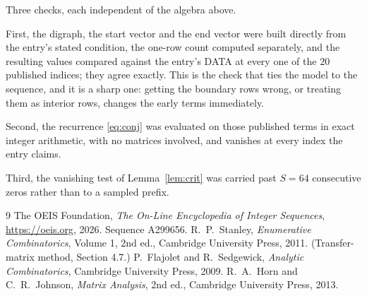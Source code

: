\documentclass[11pt,a4paper]{article}
\theoremstyle{plain}
\theoremstyle{definition}
\begin{document}
Three checks, each independent of the algebra above.

First, the digraph, the start vector and the end vector were built directly from the
entry's stated condition, the one-row count computed separately, and the resulting values
compared against the entry's DATA at every one of the $20$ published indices; they
agree exactly. This is the check that ties the model to the sequence, and it is a sharp one:
getting the boundary rows wrong, or treating them as interior rows, changes the early terms
immediately.

Second, the recurrence \eqref{eq:conj} was evaluated on those published terms in exact
integer arithmetic, with no matrices involved, and vanishes at every index the entry claims.

Third, the vanishing test of Lemma~\ref{lem:crit} was carried past $S=64$ consecutive
zeros rather than to a sampled prefix.

\begin{thebibliography}{9}
 The OEIS Foundation, \emph{The On-Line Encyclopedia of Integer
Sequences}, \url{https://oeis.org}, 2026. Sequence A299656.
 R.~P.~Stanley, \emph{Enumerative Combinatorics}, Volume 1, 2nd ed.,
Cambridge University Press, 2011. (Transfer-matrix method, Section 4.7.)
 P.~Flajolet and R.~Sedgewick, \emph{Analytic Combinatorics}, Cambridge
University Press, 2009.
 R.~A.~Horn and C.~R.~Johnson, \emph{Matrix Analysis}, 2nd ed., Cambridge
University Press, 2013.
\end{thebibliography}
\end{document}

